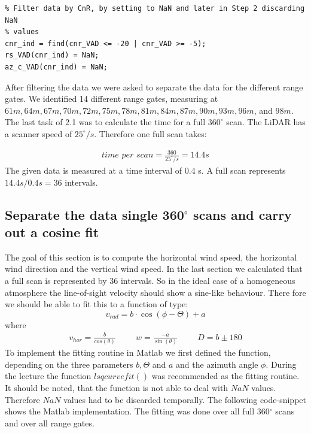 \documentclass[10pt]{article}
\begin{document}
\begin{lstlisting}
% Filter data by CnR, by setting to NaN and later in Step 2 discarding NaN
% values
cnr_ind = find(cnr_VAD <= -20 | cnr_VAD >= -5);
rs_VAD(cnr_ind) = NaN;
az_c_VAD(cnr_ind) = NaN;
\end{lstlisting}
After filtering the data we were asked to separate the data for the different range gates. We identified 14 different range gates, measuring at $61m, 64m, 67m, 70m, 72m, 75m, 78m, 81m, 84m, 87m, 90m, 93m, 96m$, and $98m$. 
The last task of 2.1 was to calculate the time for a full $360^\circ$ scan. The LiDAR has a scanner speed of $25^\circ/s$. Therefore one full scan takes:

\begin{align*}
\textit{time per scan} = \frac{360}{25^\circ/s} = 14.4s 
\end{align*}
The given data is measured at a time interval of 0.4 s. A full scan represents $14.4s / 0.4s = 36$ intervals.
\subsection{Separate the data single 360$^\circ$ scans and carry out a cosine fit}
The goal of this section is to compute the horizontal wind speed, the horizontal wind direction and the vertical wind speed. In the last section we calculated that a full scan is represented by 36 intervals. So in the ideal case of a homogeneous atmosphere the line-of-sight velocity should show a sine-like behaviour. There fore we should be able to fit this to a function of type:
\begin{equation*}
v_{rad} =  b \cdot\cos(\phi - \Theta) +a
\end{equation*}
where 
\begin{align*}
v_{hor} = \frac{b}{cos(\theta)} \hspace{1cm} w= \frac{-a}{\sin(\theta)} \hspace{1cm} D= b \pm 180
\end{align*}
To implement the fitting routine in Matlab we first defined the function, depending on the three parameters $b, \Theta$ and $a$ and the azimuth angle $\phi$. During the lecture the function $lsqcurvefit()$ was recommended as the fitting routine. It should be noted, that the function is not able to deal with $NaN$ values. Therefore $NaN$ values had to be discarded temporally.
The following code-snippet shows the Matlab implementation. The fitting was done over all full 360$^\circ$ scans and over all range gates.
\end{document}
